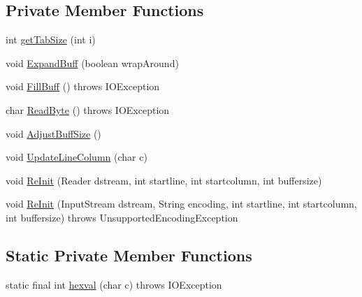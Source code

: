 \subsection*{Private Member Functions}
\begin{DoxyCompactItemize}
\item 
int \hyperlink{classuk_1_1ac_1_1manchester_1_1cs_1_1_b_o_m_safe_java_char_stream_ab8d06932bb006b433149b810fccb886e}{get\-Tab\-Size} (int i)
\item 
void \hyperlink{classuk_1_1ac_1_1manchester_1_1cs_1_1_b_o_m_safe_java_char_stream_ae49fc285c506a682c8bc17518c647a2c}{Expand\-Buff} (boolean wrap\-Around)
\item 
void \hyperlink{classuk_1_1ac_1_1manchester_1_1cs_1_1_b_o_m_safe_java_char_stream_a45a0526fb6375b269e9e949dc3988ad0}{Fill\-Buff} ()  throws I\-O\-Exception 
\item 
char \hyperlink{classuk_1_1ac_1_1manchester_1_1cs_1_1_b_o_m_safe_java_char_stream_a6e37a90396f22b305e503401f5335419}{Read\-Byte} ()  throws I\-O\-Exception 
\item 
void \hyperlink{classuk_1_1ac_1_1manchester_1_1cs_1_1_b_o_m_safe_java_char_stream_abb6293ec9a3d0a50ab64424f88771bda}{Adjust\-Buff\-Size} ()
\item 
void \hyperlink{classuk_1_1ac_1_1manchester_1_1cs_1_1_b_o_m_safe_java_char_stream_a8fb046a275a244f6fb47c8a64e709c2e}{Update\-Line\-Column} (char c)
\item 
void \hyperlink{classuk_1_1ac_1_1manchester_1_1cs_1_1_b_o_m_safe_java_char_stream_ac50d073943b4ee0913c0e21e74b58592}{Re\-Init} (Reader dstream, int startline, int startcolumn, int buffersize)
\item 
void \hyperlink{classuk_1_1ac_1_1manchester_1_1cs_1_1_b_o_m_safe_java_char_stream_a5ef2deb64e94eda26fd5f3183229b95e}{Re\-Init} (Input\-Stream dstream, String encoding, int startline, int startcolumn, int buffersize)  throws Unsupported\-Encoding\-Exception 
\end{DoxyCompactItemize}
\subsection*{Static Private Member Functions}
\begin{DoxyCompactItemize}
\item 
static final int \hyperlink{classuk_1_1ac_1_1manchester_1_1cs_1_1_b_o_m_safe_java_char_stream_ad3dc5073efaffe0a9dc4973e49efe3d9}{hexval} (char c)  throws I\-O\-Exception 
\end{DoxyCompactItemize}
